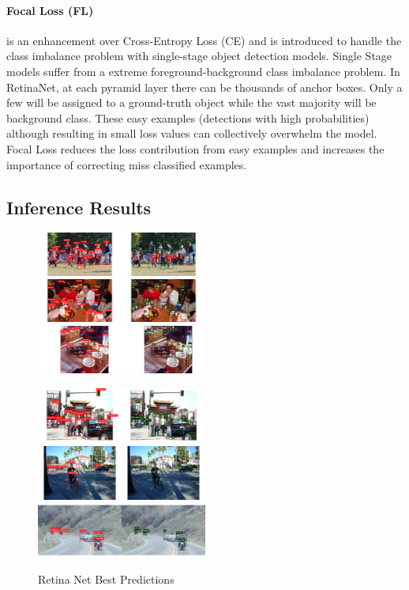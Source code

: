 \documentclass[12pt]{article}
\begin{document}
\paragraph{Focal Loss (FL)}
 is an enhancement over Cross-Entropy Loss (CE) and is introduced to handle the class imbalance problem with single-stage object detection models. Single Stage models suffer from a extreme foreground-background class imbalance problem. In RetinaNet, at each pyramid layer there can be thousands of anchor boxes. Only a few will be assigned to a ground-truth object while the vast majority will be background class. These easy examples (detections with high probabilities) although resulting in small loss values can collectively overwhelm the model. Focal Loss reduces the loss contribution from easy examples and increases the importance of correcting miss classified examples.

\subsection{Inference Results}

\begin{figure}[htbp]
    {\raggedright
    \includegraphics[width=0.5\textwidth]{images/retina_res/retina_b1.png}
    \includegraphics[width=0.5\textwidth]{images/retina_res/retina_b2.png}
    \includegraphics[width=0.5\textwidth]{images/retina_res/retina_b3.png}}
    {\raggedleft
    \includegraphics[width=0.5\textwidth]{images/retina_res/retina_b4.png}
    \includegraphics[width=0.5\textwidth]{images/retina_res/retina_b5.png}
    \includegraphics[width=0.5\textwidth]{images/retina_res/retina_b6.png}}
    \caption{Retina Net Best Predictions}
    \label{fig:retina2}
\end{figure}
\end{document}
